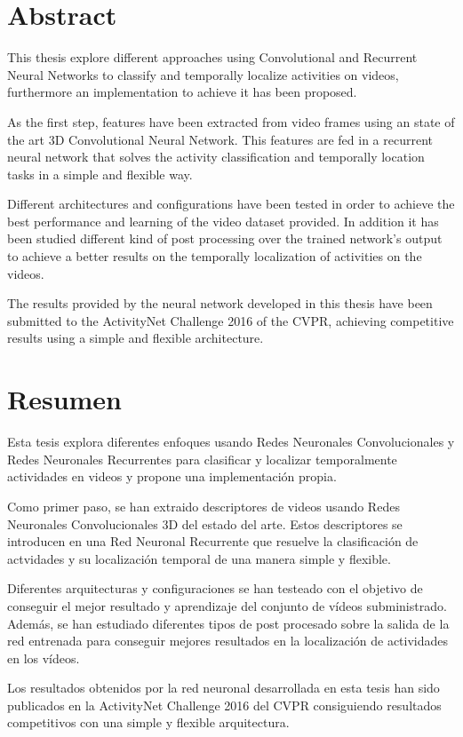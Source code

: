 \chapter*{Abstract}

This thesis explore different approaches using Convolutional and Recurrent Neural Networks to classify and temporally localize activities on videos, furthermore an implementation to achieve it has been proposed.

As the first step, features have been extracted from video frames using an state of the art 3D Convolutional Neural Network. This features are fed in a recurrent neural network that solves the activity classification and temporally location tasks in a simple and flexible way.

Different architectures and configurations have been tested in order to achieve the best performance and learning of the video dataset provided. In addition it has been studied different kind of post processing over the trained network's output to achieve a better results on the temporally localization of activities on the videos.

The results provided by the neural network developed in this thesis have been submitted to the ActivityNet Challenge 2016 of the CVPR, achieving competitive results using a simple and flexible architecture.

\chapter*{Resumen}

Esta tesis explora diferentes enfoques usando Redes Neuronales Convolucionales y Redes Neuronales Recurrentes para clasificar y localizar temporalmente actividades en videos y propone una implementación propia.

Como primer paso, se han extraido descriptores de videos usando Redes Neuronales Convolucionales 3D del estado del arte. Estos descriptores se introducen en una Red Neuronal Recurrente que resuelve la clasificación de actvidades y su localización temporal de una manera simple y flexible.

Diferentes arquitecturas y configuraciones se han testeado con el objetivo de conseguir el mejor resultado y aprendizaje del conjunto de vídeos subministrado. Además, se han estudiado diferentes tipos de post procesado sobre la salida de la red entrenada para conseguir mejores resultados en la localización de actividades en los vídeos.

Los resultados obtenidos por la red neuronal desarrollada en esta tesis han sido publicados en la ActivityNet Challenge 2016 del CVPR consiguiendo resultados competitivos con una simple y flexible arquitectura.

